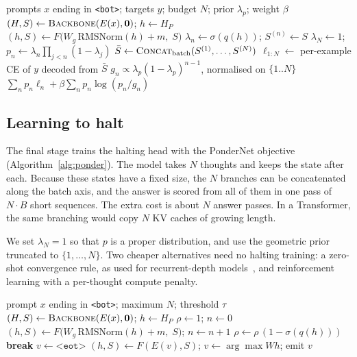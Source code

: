 \documentclass[10pt]{article}
\newcommand{\eot}{\texttt{<eot>}}
\renewcommand{\bot}{\texttt{<bot>}}
\begin{document}
\begin{algorithm}[t]
\caption{PonderNet step with batched branch scoring}
\label{alg:ponder}
\begin{algorithmic}[1]
\Require prompts $x$ ending in \bot; targets $y$; budget $N$; prior $\lambda_p$; weight $\beta$
\State $(H, S) \gets \textsc{Backbone}(E(x), \mathbf{0})$; \quad $h \gets H_P$
  \State $(h, S) \gets F\big(W_g\,\mathrm{RMSNorm}(h) + m,\; S\big)$
  \State $\lambda_n \gets \sigma(q(h))$; \quad $S^{(n)} \gets S$
\EndFor
\State $\lambda_N \gets 1$; \quad $p_n \gets \lambda_n \prod_{j<n}(1-\lambda_j)$ 
\State $\bar S \gets \textsc{Concat}_{\text{batch}}(S^{(1)}, \dots, S^{(N)})$
\State $\ell_{1:N} \gets$ per-example CE of $y$ decoded from $\bar S$ 
\State $g_n \propto \lambda_p (1-\lambda_p)^{n-1}$, normalised on $\{1..N\}$
\State \Return $\sum_n p_n \ell_n + \beta \sum_n p_n \log(p_n / g_n)$
\end{algorithmic}
\end{algorithm}

\subsection{Learning to halt}

The final stage trains the halting head with the PonderNet objective (Algorithm~\ref{alg:ponder}). The model takes $N$ thoughts and keeps the state after each. Because these states have a fixed size, the $N$ branches can be concatenated along the batch axis, and the answer is scored from all of them in one pass of $N \cdot B$ short sequences. The extra cost is about $N$ answer passes. In a Transformer, the same branching would copy $N$ KV caches of growing length.

We set $\lambda_N = 1$ so that $p$ is a proper distribution, and use the geometric prior truncated to $\{1, \dots, N\}$. Two cheaper alternatives need no halting training: a zero-shot convergence rule, as used for recurrent-depth models~\cite{geiping2025recurrent,tur2026rdvla}, and reinforcement learning with a per-thought compute penalty.

\begin{algorithm}[t]
\caption{Adaptive latent generation}
\label{alg:generate}
\begin{algorithmic}[1]
\Require prompt $x$ ending in \bot; maximum $N$; threshold $\tau$
\State $(H, S) \gets \textsc{Backbone}(E(x), \mathbf{0})$; \quad $h \gets H_P$
\State $\rho \gets 1$; \quad $n \gets 0$ 
  \State $(h, S) \gets F\big(W_g\,\mathrm{RMSNorm}(h) + m,\; S\big)$; \quad $n \gets n + 1$
  \State $\rho \gets \rho\,(1 - \sigma(q(h)))$
   \textbf{break} \EndIf
\EndWhile
\State $v \gets \eot$
\Repeat
  \State $(h, S) \gets F(E(v), S)$; \quad $v \gets \arg\max W h$; \quad emit $v$
\end{algorithmic}
\end{algorithm}
\end{document}
